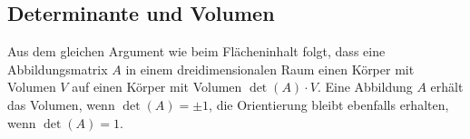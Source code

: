 \subsection{Determinante und Volumen}
Aus dem gleichen Argument wie beim Flächeninhalt folgt, dass eine
Abbildungsmatrix $A$ in einem dreidimensionalen Raum einen Körper mit
Volumen $V$ auf einen Körper mit Volumen $\det(A)\cdot V$.
Eine Abbildung $A$ erhält das Volumen, wenn $\det(A)=\pm 1$,
die Orientierung bleibt ebenfalls erhalten, wenn $\det(A)=1$.

%
%
%
%
%
